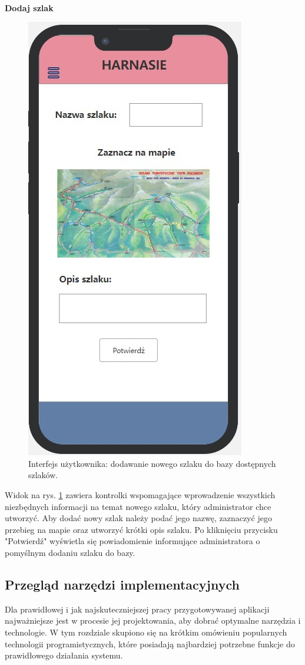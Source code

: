    \\
   \textbf{Dodaj szlak}
     \begin{figure}[H]
        \centering
        \includegraphics[scale=0.5]{img/interfejsy/if_nowy_szlak.jpg}
        \caption{Interfejs użytkownika: dodawanie nowego szlaku do bazy dostępnych szlaków.}
        \label{interfejs:dodaj}
    \end{figure}
   Widok na rys. \ref{interfejs:dodaj} zawiera kontrolki wspomagające wprowadzenie wszystkich niezbędnych informacji na temat nowego szlaku, który administrator chce utworzyć. Aby dodać nowy szlak należy podać jego nazwę, zaznaczyć jego przebieg na mapie oraz utworzyć krótki opis szlaku. Po kliknięciu przycisku "Potwierdź" wyświetla się powiadomienie informujące administratora o pomyślnym dodaniu szlaku do bazy.

   \subsection{Przegląd narzędzi implementacyjnych}
Dla prawidłowej i jak najskuteczniejszej pracy przygotowywanej aplikacji najważniejsze jest w procesie jej projektowania, aby dobrać optymalne narzędzia i technologie. W tym rozdziale skupiono się na krótkim omówieniu popularnych technologii programistycznych, które posiadają najbardziej potrzebne funkcje do prawidłowego działania systemu.

